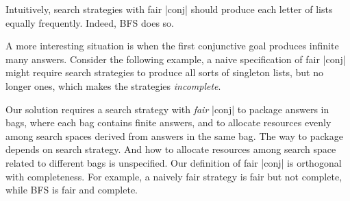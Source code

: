 \documentclass[format=acmlarge, review=true, authordraft=true]{acmart}
\begin{document}
\begin{center}
	\begin{schemeregion}
	\end{schemeregion}
\end{center}

\begin{center}
	\begin{schemeregion}
	\end{schemeregion}
\end{center}

Intuitively, search strategies with fair \scheme|conj| should produce each letter of 
lists equally frequently. Indeed, BFS does so.

\begin{center}
	\begin{schemeregion}
	\end{schemeregion}
\end{center}

A more interesting situation is when the first conjunctive goal produces 
infinite many answers. Consider the following example, a naive specification of 
fair \scheme|conj| might require search strategies to produce all sorts of singleton 
lists, but no longer ones, which makes the strategies \emph{incomplete}. 



\begin{center}
	\begin{schemeregion}
	\end{schemeregion}
\end{center}

Our solution requires a search strategy with \emph{fair} \scheme|conj| to 
package answers in bags, where each bag contains finite answers, and to allocate 
resources evenly among search spaces derived from answers in the same bag. The 
way to package depends on search strategy. And how to allocate resources among 
search space related to different bags is unspecified. Our definition of fair 
\scheme|conj| is orthogonal with completeness. For example, a naively fair strategy 
is fair but not complete, while BFS is fair and complete. 
\end{document}
